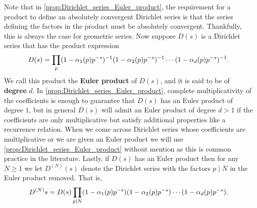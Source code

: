       Note that in \cref{prop:Dirichlet_series_Euler_product}, the requirement for a product to define an absolutely convergent Dirichlet series is that the series defining the factors in the product must be absolutely convergent. Thankfully, this is always the case for geometric series. Now suppose $D(s)$ is a Dirichlet series that has the product expression
      \[
        D(s) = \prod_{p}(1-\alpha_{1}(p)p^{-s})^{-1}(1-\alpha_{2}(p)p^{-s})^{-1} \cdots (1-\alpha_{d}(p)p^{-s})^{-1}.
      \]
      We call this product the \textbf{Euler product} of $D(s)$, and it is said to be of \textbf{degree} $d$. In \cref{prop:Dirichlet_series_Euler_product}, complete multiplicativity of the coefficients is enough to guarantee that $D(s)$ has an Euler product of degree $1$, but in general $D(s)$ will admit an Euler product of degree $d > 1$ if the coefficients are only multiplicative but satisfy additional properties like a recurrence relation. When we come across Dirichlet series whose coefficients are multiplicative or we are given an Euler product we will use \cref{prop:Dirichlet_series_Euler_product} without mention as this is common practice in the literature. Lastly, if $D(s)$ has an Euler product then for any $N \ge 1$ we let $D^{(N)}(s)$ denote the Dirichlet series with the factors $p \mid N$ in the Euler product removed. That is,
      \[
        D^{(N)}s = D(s)\prod_{p \mid N}(1-\alpha_{1}(p)p^{-s})(1-\alpha_{2}(p)p^{-s}) \cdots (1-\alpha_{d}(p)p^{-s}).
      \]
